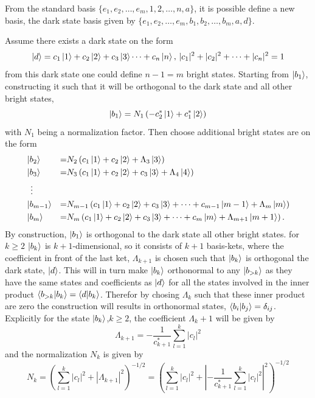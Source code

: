 From the standard basis $\{e_1,e_2,\dots,e_m,1,2,\dots,n,a\}$, it is possible define a new basis, the dark state basis given by $\{e_1,e_2,\dots,e_m,b_1,b_2,\dots,b_{m},a,d\}$.

Assume there exists a dark state on the form 
\begin{equation}
\ket{d} = c_1\ket{1} + c_2\ket{2} + c_3\ket{3} \dots + c_{n}\ket{n},\, |c_1|^2 + |c_2|^2 + \dots + |c_{n}|^2 = 1
\end{equation}
from this dark state one could define $n-1 = m$ bright states. Starting from $\ket{b_1}$, constructing it such that it will be orthogonal to the dark state and all other bright states,
\begin{equation}
\ket{b_1} = N_1\left(-c_2^{*}\ket{1} + c_1^{*}\ket{2}\right)
\end{equation}
with $N_1$ being a normalization factor. Then choose additional bright states are on the form
\begin{equation}
\label{eq:birght_states}
\begin{aligned}
&\ket{b_2} &=& N_2 \left(c_1\ket{1} + c_2\ket{2} + \Lambda_3\ket{3}  \right)
\\
&\ket{b_3} &=&  N_3 \left(c_1\ket{1} + c_2\ket{2} + c_3\ket{3} + \Lambda_{4}\ket{4} \right)
\\
&\;\;\vdots
\\
&\ket{b_{m-1}} &=& N_{m-1} \left( c_1\ket{1} + c_2\ket{2} + c_3\ket{3}  + \dots + c_{m-1}\ket{m-1}+ \Lambda_m\ket{m} \right)
\\
&\ket{b_{m}} &=& N_m \left( c_1\ket{1} + c_2\ket{2} + c_3\ket{3}  + \dots + c_m\ket{m} + \Lambda_{m+1}\ket{m+1} \right).
\end{aligned}
\end{equation}
By construction,  $\ket{b_1}$ is orthogonal to the dark state  all other bright states. for $k \geq 2$ $\ket{b_k}$ is $k+1$-dimensional, so it consists of $k+1$ basis-kets, where the coefficient in front of the last ket, $\Lambda_{k+1}$ is chosen such that $\ket{b_k}$ is orthogonal the dark state, $\ket{d}$. This will in turn make $\ket{b_k}$ orthonormal to any $\ket{b_{>k}}$ as they have the same states and coefficients as $\ket{d}$ for all the states involved in the inner product $\bra{b_{>k}}\ket{b_k} = \bra{d}\ket{b_k}$. Therefor by chosing $\Lambda_k$ such that these inner product are zero the construction will results in orthonormal states,  $\bra{b_i}\ket{b_j} = \delta_{ij}$. Explicitly for the state $\ket{b_{k}}$,$k \geq 2$, the coefficient $\Lambda_k+1$ will be given by 
\begin{equation}
\Lambda_{k+1} = -\dfrac{1}{c_{k+1}^{*}}\sum_{l = 1}^{k}|c_l|^2
\end{equation}
and the normalization $N_{k}$ is given by 
\begin{equation}
N_k =  \left( \sum_{l = 1}^k|c_l|^2  + \left|\Lambda_{k+1}\right|^2 \right)^{-1/2} = \left( \sum_{l = 1}^k|c_l|^2  + \left|-\frac{1}{c_{k+1}^{*}}\sum_{l = 1}^{k} |c_l|^2 \right|^2 \right)^{-1/2}
\end{equation}


